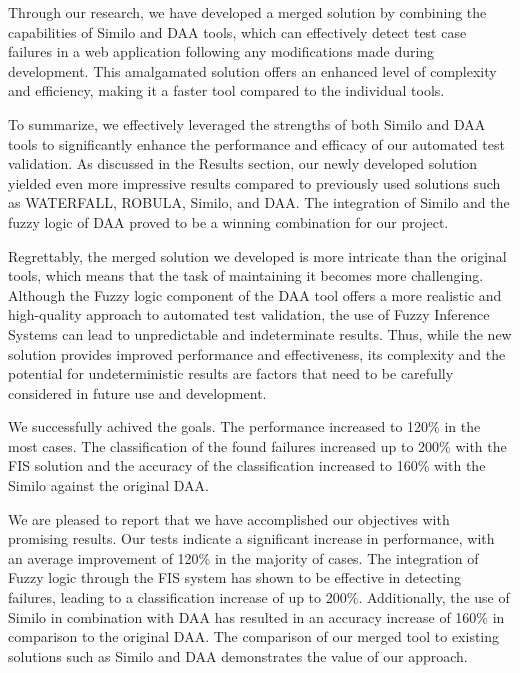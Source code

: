 \documentclass{article}
\begin{document}
Through our research, we have developed a merged solution by combining the capabilities of Similo\cite{similo} and DAA\cite{fuzzy_ai_in_web_testing} tools, which can effectively detect test case failures in a web application following any modifications made during development. This amalgamated solution offers an enhanced level of complexity and efficiency, making it a faster tool compared to the individual tools.

To summarize, we effectively leveraged the strengths of both Similo\cite{similo} and DAA\cite{fuzzy_ai_in_web_testing} tools to significantly enhance the performance and efficacy of our automated test validation. As discussed in the Results section, our newly developed solution yielded even more impressive results compared to previously used solutions such as WATERFALL\cite{waterfall}, ROBULA\cite{robula}, Similo\cite{similo}, and DAA\cite{fuzzy_ai_in_web_testing}. The integration of Similo\cite{similo} and the fuzzy logic of DAA\cite{fuzzy_ai_in_web_testing} proved to be a winning combination for our project.

Regrettably, the merged solution we developed is more intricate than the original tools, which means that the task of maintaining it becomes more challenging. Although the Fuzzy logic component of the DAA\cite{fuzzy_ai_in_web_testing} tool offers a more realistic and high-quality approach to automated test validation, the use of Fuzzy Inference Systems can lead to unpredictable and indeterminate results. Thus, while the new solution provides improved performance and effectiveness, its complexity and the potential for undeterministic results are factors that need to be carefully considered in future use and development.

We successfully achived the goals. The performance increased to 120\% in the most cases. The classification of the found failures increased up to 200\% with the FIS solution and the accuracy of the classification increased to 160\% with the Similo\cite{similo} against the original DAA\cite{fuzzy_ai_in_web_testing}.

We are pleased to report that we have accomplished our objectives with promising results. Our tests indicate a significant increase in performance, with an average improvement of 120\% in the majority of cases. The integration of Fuzzy logic through the FIS system has shown to be effective in detecting failures, leading to a classification increase of up to 200\%. Additionally, the use of Similo\cite{similo} in combination with DAA has resulted in an accuracy increase of 160\% in comparison to the original DAA\cite{fuzzy_ai_in_web_testing}. The comparison of our merged tool to existing solutions such as Similo\cite{similo} and DAA\cite{fuzzy_ai_in_web_testing} demonstrates the value of our approach.
\end{document}
